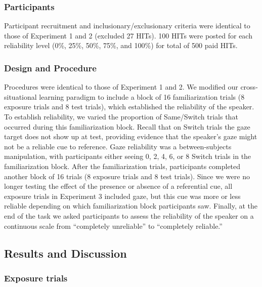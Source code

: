 \documentclass[authoryear, review]{elsarticle}
\begin{document}
\subsubsection{Participants}\label{participants-2}

Participant recruitment and inclusionary/exclusionary criteria were
identical to those of Experiment 1 and 2 (excluded 27 HITs). 100 HITs
were posted for each reliability level (0\%, 25\%, 50\%, 75\%, and
100\%) for total of 500 paid HITs.

\subsubsection{Design and Procedure}\label{design-and-procedure-2}

Procedures were identical to those of Experiment 1 and 2. We modified
our cross-situational learning paradigm to include a block of 16
familiarization trials (8 exposure trials and 8 test trials), which
established the reliability of the speaker. To establish reliability, we
varied the proportion of Same/Switch trials that occurred during this
familiarization block. Recall that on Switch trials the gaze target does
not show up at test, providing evidence that the speaker's gaze might
not be a reliable cue to reference. Gaze reliability was a
between-subjects manipulation, with participants either seeing 0, 2, 4,
6, or 8 Switch trials in the familiarization block. After the
familiarization trials, participants completed another block of 16
trials (8 exposure trials and 8 test trials). Since we were no longer
testing the effect of the presence or absence of a referential cue, all
exposure trials in Experiment 3 included gaze, but this cue was more or
less reliable depending on which familiarization block participants saw.
Finally, at the end of the task we asked participants to assess the
reliability of the speaker on a continuous scale from ``completely
unreliable'' to ``completely reliable.''

\subsection{Results and Discussion}\label{results-and-discussion-2}

\subsubsection{Exposure trials}\label{exposure-trials-2}
\end{document}
